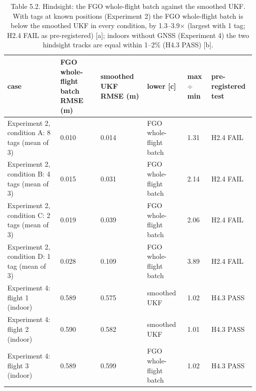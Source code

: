 \begin{table}[htbp]
\centering
\footnotesize
\caption{Table 5.2. Hindsight: the FGO whole-flight batch against the smoothed UKF. With tags at known positions (Experiment 2) the FGO whole-flight batch is below the smoothed UKF in every condition, by 1.3--3.9$\times$ (largest with 1 tag; H2.4 FAIL as pre-registered) [a]; indoors without GNSS (Experiment 4) the two hindsight tracks are equal within 1--2\% (H4.3 PASS) [b].}
\label{tab:5-2}
\begin{tabular}{p{}p{}p{}p{}p{}p{}}
\toprule
\textbf{case} & \textbf{FGO whole-flight batch RMSE (m)} & \textbf{smoothed UKF RMSE (m)} & \textbf{lower [c]} & \textbf{max $\div$ min} & \textbf{pre-registered test} \\
\midrule
Experiment 2, condition A: 8 tags (mean of 3) & 0.010 & 0.014 & FGO whole-flight batch & 1.31 & H2.4 FAIL \\
Experiment 2, condition B: 4 tags (mean of 3) & 0.015 & 0.031 & FGO whole-flight batch & 2.14 & H2.4 FAIL \\
Experiment 2, condition C: 2 tags (mean of 3) & 0.019 & 0.039 & FGO whole-flight batch & 2.06 & H2.4 FAIL \\
Experiment 2, condition D: 1 tag (mean of 3) & 0.028 & 0.109 & FGO whole-flight batch & 3.89 & H2.4 FAIL \\
Experiment 4: flight 1 (indoor) & 0.589 & 0.575 & smoothed UKF & 1.02 & H4.3 PASS \\
Experiment 4: flight 2 (indoor) & 0.590 & 0.582 & smoothed UKF & 1.01 & H4.3 PASS \\
Experiment 4: flight 3 (indoor) & 0.589 & 0.599 & FGO whole-flight batch & 1.02 & H4.3 PASS \\
\bottomrule
\end{tabular}
\par\smallskip\raggedright

\end{table}
